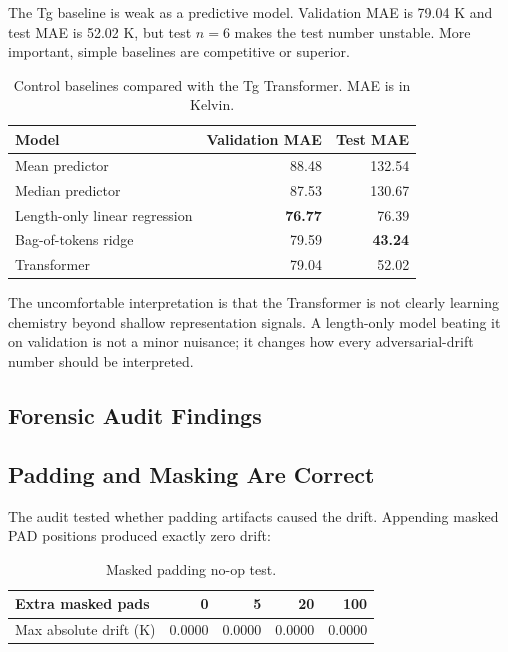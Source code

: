 \documentclass[11pt]{article}
\begin{document}
The Tg baseline is weak as a predictive model. Validation MAE is 79.04 K and
test MAE is 52.02 K, but test $n=6$ makes the test number unstable. More
important, simple baselines are competitive or superior.

\begin{table}[H]
\centering
\caption{Control baselines compared with the Tg Transformer. MAE is in Kelvin.}
\begin{tabular}{@{}lrr@{}}
\toprule
Model & Validation MAE & Test MAE \\
\midrule
Mean predictor & 88.48 & 132.54 \\
Median predictor & 87.53 & 130.67 \\
Length-only linear regression & \textbf{76.77} & 76.39 \\
Bag-of-tokens ridge & 79.59 & \textbf{43.24} \\
Transformer & 79.04 & 52.02 \\
\bottomrule
\end{tabular}
\end{table}

The uncomfortable interpretation is that the Transformer is not clearly learning
chemistry beyond shallow representation signals. A length-only model beating it
on validation is not a minor nuisance; it changes how every adversarial-drift
number should be interpreted.

\subsection{Forensic Audit Findings}

\subsection{Padding and Masking Are Correct}

The audit tested whether padding artifacts caused the drift. Appending masked
PAD positions produced exactly zero drift:

\begin{table}[H]
\centering
\caption{Masked padding no-op test.}
\begin{tabular}{@{}lrrrr@{}}
\toprule
Extra masked pads & 0 & 5 & 20 & 100 \\
\midrule
Max absolute drift (K) & 0.0000 & 0.0000 & 0.0000 & 0.0000 \\
\bottomrule
\end{tabular}
\end{table}
\end{document}
